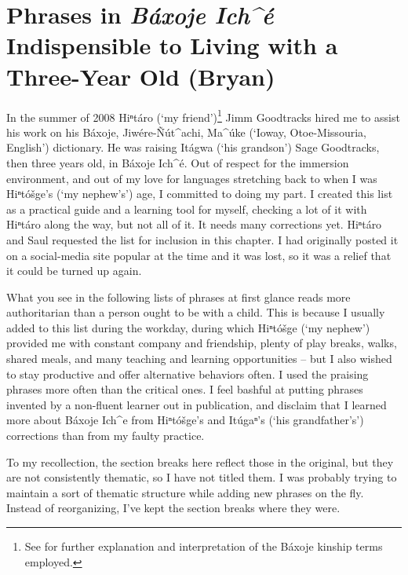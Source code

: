 \documentclass[output=paper]{LSP/langsci}
\begin{document}
\section{Phrases in \emph{Báxoje Ich\^{ }é} Indispensible to Living with a Three-Year Old (Bryan)}\label{bryan}
	In the summer of 2008 Hiⁿtáro (`my friend')\footnote{See  for further explanation and interpretation of the Báxoje kinship terms employed.} Jimm Goodtracks hired me to assist his work on his Báxoje, Jiwére-\~Nút\^{ }achi, Ma\^{ }úke (`Ioway, Otoe-Missouria, English') dictionary. He was raising Itágwa (`his grandson') Sage Goodtracks, then three years old, in Báxoje Ich\^{ }é. Out of respect for the immersion environment, and out of my love for languages stretching back to when I was Hiⁿtóšge's (`my nephew's') age, I committed to doing my part. I created this list as a practical guide and a learning tool for myself, checking a lot of it with Hiⁿtáro along the way, but not all of it. It needs many corrections yet. Hiⁿtáro and Saul requested the list for inclusion in this chapter. I had originally posted it on a social-media site popular at the time and it was lost, so it was a relief that it could be turned up again. 

What you see in the following lists of phrases
at first glance reads more authoritarian than a person ought to be with a child. This is because I usually added to this list during the workday, during which Hiⁿtóšge (`my nephew') provided me with constant company and friendship, plenty of play breaks, walks, shared meals, and many teaching and learning opportunities -- but I also wished to stay productive and offer alternative behaviors often. I used the praising phrases more often than the critical ones. I feel bashful at putting phrases invented by a non-fluent learner out in publication, and disclaim that I learned more about Báxoje Ich\^{ }e from Hiⁿtóšge's and Itúgaⁿ's (`his grandfather's') corrections than from my faulty practice. 

To my recollection, the section breaks here reflect those in the original, but they are not consistently thematic, so I have not titled them. I was probably trying to maintain a sort of thematic structure while adding new phrases on the fly. Instead of reorganizing, I've kept the section breaks where they were.

\end{document}
